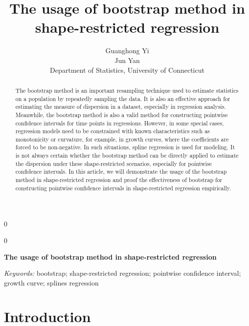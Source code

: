 \documentclass[12pt]{article}
\newcommand{\blind}{0}
\begin{document}
\def\spacingset#1{\renewcommand{\baselinestretch}%
{#1}\small\normalsize} \spacingset{1}



\blind
{
  \title{\bf The usage of bootstrap method in shape-restricted regression}
  \author{Guanghong Yi\\
  Jun Yan\\[1ex]
  Department of Statistics, University of Connecticut\\
}
  \maketitle
} \fi

\blind
{
  \bigskip
  \bigskip
  \bigskip
  \begin{center}
    {\LARGE\bf The usage of bootstrap method in shape-restricted regression}
\end{center}
  \medskip
} \fi

\bigskip
\begin{abstract}
The bootstrap method is an important resampling technique used to estimate 
statistics on a population by repeatedly sampling the data. It is also an 
effective approach for estimating the measure of dispersion in a dataset, 
especially in regression analysis. Meanwhile, the bootstrap method is also
a valid method for constructing pointwise confidence intervals for time 
points in regressions. However, in some special cases, regression models 
need to be constrained with known characteristics such as monotonicity or
curvature, for example, in growth curves, where the coefficients are 
forced to be non-negative. In such situations, spline regression is used
for modeling. It is not always certain whether the bootstrap method can 
be directly applied to estimate the dispersion under these shape-restricted
scenarios, especially for pointwise confidence intervals. In this article,
we will demonstrate the usage of the bootstrap method in shape-restricted 
regression and proof the effectiveness of bootstrap for constructing 
pointwise confidence intervals in shape-restricted regression empirically.
\end{abstract}

\noindent%
{\it Keywords:}  bootstrap; shape-restricted regression; 
pointwise confidence interval; growth curve; splines regression
\vfill

\newpage
\spacingset{1.45} 
\section{Introduction}
\label{sec:intro}
\end{document}
